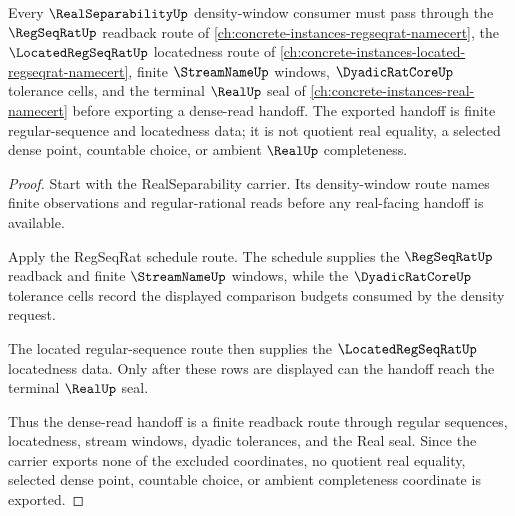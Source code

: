 \begin{theorem}
\label{thm:real-separability-located-regseqrat-density-readback}
Every $\RealSeparabilityUp$ density-window consumer must pass through the $\RegSeqRatUp$ readback route of \autoref{ch:concrete-instances-regseqrat-namecert}, the $\LocatedRegSeqRatUp$ locatedness route of \autoref{ch:concrete-instances-located-regseqrat-namecert}, finite $\StreamNameUp$ windows, $\DyadicRatCoreUp$ tolerance cells, and the terminal $\RealUp$ seal of \autoref{ch:concrete-instances-real-namecert} before exporting a dense-read handoff. The exported handoff is finite regular-sequence and locatedness data; it is not quotient real equality, a selected dense point, countable choice, or ambient $\RealUp$ completeness.
\end{theorem}
\begin{proof}
Start with the RealSeparability carrier. Its density-window route names finite observations and regular-rational reads before any real-facing handoff is available.

Apply the RegSeqRat schedule route. The schedule supplies the $\RegSeqRatUp$ readback and finite $\StreamNameUp$ windows, while the $\DyadicRatCoreUp$ tolerance cells record the displayed comparison budgets consumed by the density request.

The located regular-sequence route then supplies the $\LocatedRegSeqRatUp$ locatedness data. Only after these rows are displayed can the handoff reach the terminal $\RealUp$ seal.

Thus the dense-read handoff is a finite readback route through regular sequences, locatedness, stream windows, dyadic tolerances, and the Real seal. Since the carrier exports none of the excluded coordinates, no quotient real equality, selected dense point, countable choice, or ambient completeness coordinate is exported.
\end{proof}
